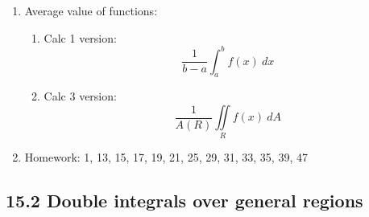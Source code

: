 \documentclass{article}
\begin{document}
\begin{enumerate}
\item Average value of functions:
\begin{enumerate}
\item Calc 1 version:
\[
\frac{1}{b-a} \int_a^b f(x) ~dx
\]
\item Calc 3 version:
\[
\frac{1}{A(R)} \iint\limits_R f(x) ~dA
\]
\end{enumerate}

\item Homework: 1, 13, 15, 17, 19, 21, 25, 29, 31, 33, 35, 39, 47

\end{enumerate}


\subsection{15.2 Double integrals over general regions}
\end{document}
